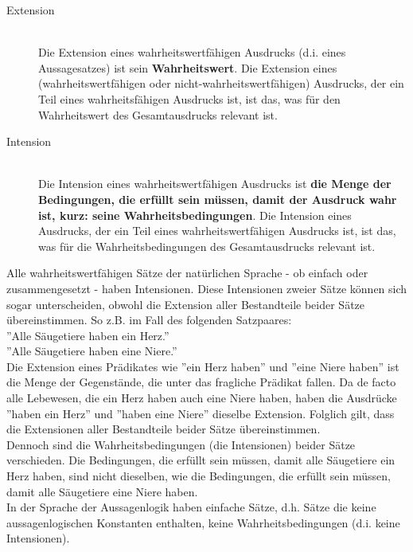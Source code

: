 \documentclass{scrartcl}
\begin{document}
\begin{description}
	\item[Extension] \mbox{}\\ Die Extension eines wahrheitswertfähigen Ausdrucks (d.i. eines Aussagesatzes) ist sein \textbf{Wahrheitswert}. Die Extension eines (wahrheitswertfähigen oder nicht-wahrheitswertfähigen) Ausdrucks, der ein Teil eines wahrheitsfähigen Ausdrucks ist, ist das, was für den Wahrheitswert des Gesamtausdrucks relevant ist.
\end{description}

\begin{description}
	\item[Intension] \mbox{}\\ Die Intension eines wahrheitswertfähigen Ausdrucks ist \textbf{die Menge der Bedingungen, die erfüllt sein müssen, damit der Ausdruck wahr ist, kurz: seine Wahrheitsbedingungen}. Die Intension eines Ausdrucks, der ein Teil eines wahrheitswertfähigen Ausdrucks ist, ist das, was für die Wahrheitsbedingungen des Gesamtausdrucks relevant ist.
\end{description}

Alle wahrheitswertfähigen Sätze der natürlichen Sprache - ob einfach oder zusammengesetzt - haben Intensionen. Diese Intensionen zweier Sätze können sich sogar unterscheiden, obwohl die Extension aller Bestandteile beider Sätze übereinstimmen. So z.B. im Fall des folgenden Satzpaares: \\

''Alle Säugetiere haben ein Herz.'' \\
''Alle Säugetiere haben eine Niere.'' \\

Die Extension eines Prädikates wie ''ein Herz haben'' und ''eine Niere haben'' ist die Menge der Gegenstände, die unter das fragliche Prädikat fallen. Da de facto alle Lebewesen, die ein Herz haben auch eine Niere haben, haben die Ausdrücke ''haben ein Herz'' und ''haben eine Niere'' dieselbe Extension. Folglich gilt, dass die Extensionen aller Bestandteile beider Sätze übereinstimmen. \\

Dennoch sind die Wahrheitsbedingungen (die Intensionen) beider Sätze verschieden. Die Bedingungen, die erfüllt sein müssen, damit alle Säugetiere ein Herz haben, sind nicht dieselben, wie die Bedingungen, die erfüllt sein müssen, damit alle Säugetiere eine Niere haben. \\

In der Sprache der Aussagenlogik haben einfache Sätze, d.h. Sätze die keine aussagenlogischen Konstanten enthalten, keine Wahrheitsbedingungen (d.i. keine Intensionen). \\
\end{document}
